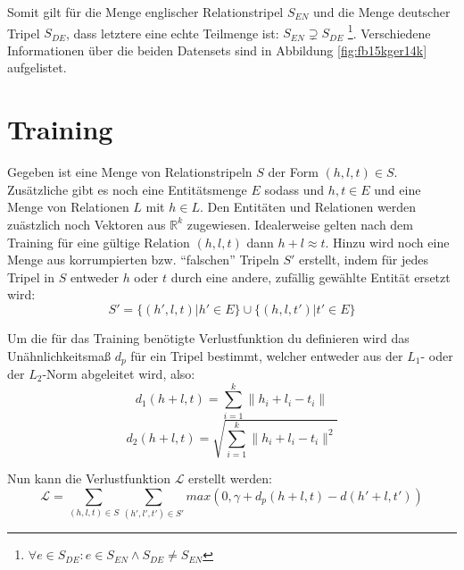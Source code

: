 Somit gilt für die Menge englischer Relationstripel $S_{EN}$ und die Menge deutscher Tripel $S_{DE}$, dass letztere
eine echte Teilmenge ist: $S_{EN} \supsetneq S_{DE}$ \footnote{$\forall e \in S_{DE}: e \in S_{EN} \wedge S_{DE} \neq S_{EN}$}.
Verschiedene Informationen über die beiden Datensets sind in Abbildung \ref{fig:fb15kger14k} aufgelistet.

\section{Training}

Gegeben ist eine Menge von Relationstripeln $S$ der Form $(h, l, t) \in S$. Zusätzliche gibt es noch eine Entitätsmenge
$E$ sodass und $h, t \in E$ und eine Menge von Relationen $L$ mit $h \in L$. Den Entitäten und Relationen werden zuästzlich
noch Vektoren aus $\mathbb{R}^k$ zugewiesen. Idealerweise gelten nach dem Training für eine gültige Relation $(h, l, t)$
dann $h + l \approx t$. Hinzu wird noch eine Menge aus korrumpierten bzw. ``falschen'' Tripeln $S'$ erstellt, indem
für jedes Tripel in $S$ entweder $h$ oder $t$ durch eine andere, zufällig gewählte Entität ersetzt wird:
\begin{equation}
  S' = \{(h', l, t) | h' \in E\} \cup \{(h, l, t') | t' \in E\}
\end{equation}

Um die für das Training benötigte Verlustfunktion du definieren wird das Unähnlichkeitsmaß $d_p$ für ein Tripel bestimmt, welcher
entweder aus der $L_1$- oder der $L_2$-Norm abgeleitet wird, also:
\begin{equation}
    d_1(h + l, t) = \sum_{i=1}^k \| h_i + l_i - t_i \|
\end{equation}
\begin{equation}
    d_2(h + l, t) = \sqrt{\sum_{i=1}^k \| h_i + l_i - t_i \|^2}
\end{equation}

Nun kann die Verlustfunktion $\mathcal{L}$ erstellt werden:
\begin{equation}
  \mathcal{L} = \sum_{(h,l,t) \in S} \sum_{(h', l', t') \in S'} max(0, \gamma + d_p(h + l, t) - d(h' + l, t'))
\end{equation}

